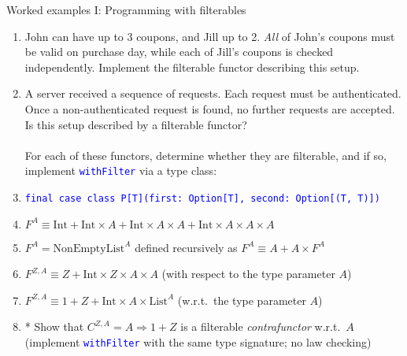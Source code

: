 \documentclass[english]{beamer}
\begin{document}
\begin{frame}{Worked examples I: Programming with filterables}
\begin{enumerate}
\item John can have up to 3 coupons, and Jill up to 2. \emph{All} of John's
coupons must be valid on purchase day, while each of Jill's coupons
is checked independently. Implement the filterable functor describing
this setup.
\item A server received a sequence of requests. Each request must be authenticated.
Once a non-authenticated request is found, no further requests are
accepted. Is this setup described by a filterable functor?\\
\ \\
For each of these functors, determine whether they are filterable,
and if so, implement \texttt{\textcolor{blue}{\footnotesize{}withFilter}}
via a type class:
\item \texttt{\textcolor{blue}{\footnotesize{}final case class P{[}T{]}(first:\ Option{[}T{]},
second:\ Option{[}(T, T){]})}}{\footnotesize \par}
\item $F^{A}\equiv\text{Int}+\text{Int}\times A+\text{Int}\times A\times A+\text{Int}\times A\times A\times A$
\item $F^{A}=\text{NonEmptyList}^{A}$ defined recursively as $F^{A}\equiv A+A\times F^{A}$ 
\item $F^{Z,A}\equiv Z+\text{Int}\times Z\times A\times A$ (with respect
to the type parameter $A$)
\item $F^{Z,A}\equiv1+Z+\text{Int}\times A\times\text{List}^{A}$ (w.r.t.\ the
type parameter $A$)
\item {*} Show that $C^{Z,A}=A\Rightarrow1+Z$ is a filterable \emph{contrafunctor}
w.r.t.\ $A$ (implement \texttt{\textcolor{blue}{\footnotesize{}withFilter}}
with the same type signature; no law checking)
\end{enumerate}
\end{frame}
\end{document}
